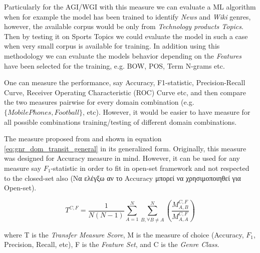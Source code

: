 Particularly for the AGI/WGI with this measure we can evaluate a ML algorithm when for example the model has been trained to identify \textit{News} and \textit{Wiki} genres, however, the available corpus would be only from \textit{Technology products Topics}. Then by testing it on {Sports Topics} we could evaluate the model in such a case when very small corpus is available for training. In addition using this methodology we can evaluate the models behavior depending on the \textit{Features} have been selected for the training, e.g. BOW, POS, Term N-grams etc. 

One can measure the performance, say Accuracy, F1-statistic, Precision-Recall Curve,  Receiver Operating Characteristic (ROC) Curve etc, and then compare the two measures pairwise for every domain combination (e.g. $\{Mobile Phones, Football\}$, etc). However, it would be easier to have measure for all possible combinations training/testing of different domain combinations. 

The measure proposed from \parencite{finn2006learning} and shown in equation \ref{eq:gnr_dom_transit_general} in its generalized form. Originally, this measure was designed for Accuracy measure in mind. However, it can be used for any measure say $F_{1}$-statistic in order to fit in open-set framework and not respected to the closed-set also (Να ελέγξω αν το Accuracy μπορεί να χρησιμοποιηθεί για Open-set). 

\begin{equation} \label{chap:eval_methods:eq:office_doc_ensemble}
	T^{C,F} = \frac{1}{N(N-1)} \sum_{A=1}^{N} \sum_{B, \forall B \neq A}^{N} \left(  \frac{M^{C,F}_{A,B}}{M^{C,F}_{A,A}} \right)
	\end{equation}

	\noindent	
where T is the \textit{Transfer Measure Score}, M is the measure of choice (Accuracy, $F_1$, Precision, Recall, etc), F is the \textit{Feature Set}, and C is the \textit{Genre Class}. 
























